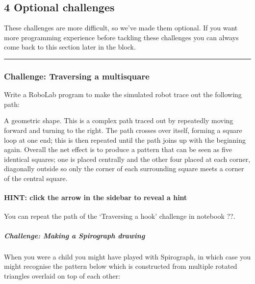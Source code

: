 \documentclass[letterpaper,10pt,english]{sphinxmanual}
\let\sphinxpxdimen\pdfpxdimen\else\newdimen\sphinxpxdimen
\begin{document}
{\subsection{4 Optional challenges}
\label{\detokenize{content/02_Robot_Lab/Section_00_04:4-Optional-challenges}}\label{\detokenize{content/02_Robot_Lab/Section_00_04::doc}}
These challenges are more difficult, so we’ve made them optional. If you want more programming experience before tackling these challenges you can always come back to this section later in the block.


\bigskip\hrule\bigskip



\subsubsection{Challenge: Traversing a multi\sphinxhyphen{}square}
\label{\detokenize{content/02_Robot_Lab/Section_00_04:Challenge:-Traversing-a-multi-square}}
Write a RoboLab program to make the simulated robot trace out the following path:

\noindent\sphinxincludegraphics[width=105\sphinxpxdimen,height=106\sphinxpxdimen]{{tm129_rob_p3_f023}.gif}

A geometric shape. This is a complex path traced out by repeatedly moving forward and turning to the right. The path crosses over itself, forming a square loop at one end; this is then repeated until the path joins up with the beginning again. Overall the net effect is to produce a pattern that can be seen as five identical squares; one is placed centrally and the other four placed at each corner, diagonally outside so only the corner of each surrounding square meets a corner of the central
square.


\paragraph{HINT: click the arrow in the sidebar to reveal a hint}
\label{\detokenize{content/02_Robot_Lab/Section_00_04:HINT:-click-the-arrow-in-the-sidebar-to-reveal-a-hint}}
You can repeat the path of the ‘Traversing a hook’ challenge in notebook ??.


\subparagraph{Challenge: Making a Spirograph drawing}
\label{\detokenize{content/02_Robot_Lab/Section_00_04:Challenge:-Making-a-Spirograph-drawing}}
When you were a child you might have played with Spirograph, in which case you might recognise the pattern below which is constructed from multiple rotated triangles overlaid on top of each other: 

}
\end{document}

